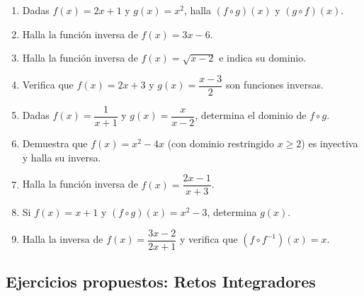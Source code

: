 \documentclass[12pt, letterpaper]{article}
\begin{document}
\begin{enumerate}[resume=ejercicios, leftmargin=*]
  \item \facil{} Dadas $f(x) = 2x + 1$ y $g(x) = x^2$, halla $(f \circ g)(x)$ y $(g \circ f)(x)$.

  \item \facil{} Halla la función inversa de $f(x) = 3x - 6$.

  \item \medio{} Halla la función inversa de $f(x) = \sqrt{x - 2}$ e indica su dominio.

  \item \medio{} Verifica que $f(x) = 2x + 3$ y $g(x) = \dfrac{x - 3}{2}$ son funciones inversas.

  \item \medio{} Dadas $f(x) = \dfrac{1}{x + 1}$ y $g(x) = \dfrac{x}{x - 2}$, determina el dominio de $f \circ g$.

  \item \dificil{} Demuestra que $f(x) = x^2 - 4x$ (con dominio restringido $x \ge 2$) es inyectiva y halla su inversa.

  \item \dificil{} Halla la función inversa de $f(x) = \dfrac{2x - 1}{x + 3}$.

  \item \dificil{} Si $f(x) = x + 1$ y $(f \circ g)(x) = x^2 - 3$, determina $g(x)$.

  \item \muyDificil{} Halla la inversa de $f(x) = \dfrac{3x - 2}{2x + 1}$ y verifica que $(f \circ f^{-1})(x) = x$.
\end{enumerate}

\subsection{Ejercicios propuestos: Retos Integradores}
\end{document}
